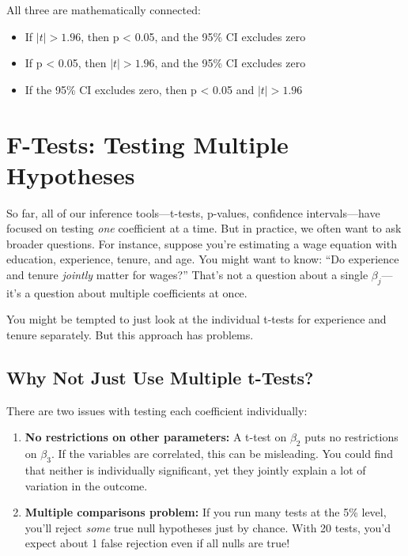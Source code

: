 \documentclass[
  letterpaper,
  DIV=11,
  numbers=noendperiod]{scrreprt}
\providecommand{\tightlist}{%
  \setlength{\itemsep}{0pt}\setlength{\parskip}{0pt}}
\begin{document}
All three are mathematically connected:

\begin{itemize}
\tightlist
\item
  If \(|t| > 1.96\), then p \textless{} 0.05, and the 95\% CI excludes
  zero
\item
  If p \textless{} 0.05, then \(|t| > 1.96\), and the 95\% CI excludes
  zero
\item
  If the 95\% CI excludes zero, then p \textless{} 0.05 and
  \(|t| > 1.96\)
\end{itemize}

\section{F-Tests: Testing Multiple
Hypotheses}\label{f-tests-testing-multiple-hypotheses}

So far, all of our inference tools---t-tests, p-values, confidence
intervals---have focused on testing \emph{one} coefficient at a time.
But in practice, we often want to ask broader questions. For instance,
suppose you're estimating a wage equation with education, experience,
tenure, and age. You might want to know: ``Do experience and tenure
\emph{jointly} matter for wages?'' That's not a question about a single
\(\beta_j\)---it's a question about multiple coefficients at once.

You might be tempted to just look at the individual t-tests for
experience and tenure separately. But this approach has problems.

\subsection{Why Not Just Use Multiple
t-Tests?}\label{why-not-just-use-multiple-t-tests}

There are two issues with testing each coefficient individually:

\begin{enumerate}
\def\labelenumi{\arabic{enumi}.}
\item
  \textbf{No restrictions on other parameters:} A t-test on \(\beta_2\)
  puts no restrictions on \(\beta_3\). If the variables are correlated,
  this can be misleading. You could find that neither is individually
  significant, yet they jointly explain a lot of variation in the
  outcome.
\item
  \textbf{Multiple comparisons problem:} If you run many tests at the
  5\% level, you'll reject \emph{some} true null hypotheses just by
  chance. With 20 tests, you'd expect about 1 false rejection even if
  all nulls are true!
\end{enumerate}
\end{document}
